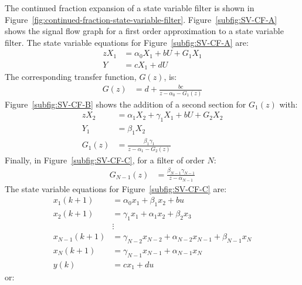 \documentclass[a4paper,twoside,10pt,english]{report}
\begin{document}
The continued fraction expansion of a state variable filter is shown in 
Figure~\ref{fig:continued-fraction-state-variable-filter}. 
Figure~\ref{subfig:SV-CF-A} shows the signal flow graph for a first order 
approximation to a state variable filter. The state variable equations for 
Figure~\ref{subfig:SV-CF-A} are:
\begin{align*}
zX_{1}&=\alpha_{0}X_{1}+bU + G_{1}X_{1}\\
Y&=cX_{1}+dU
\end{align*}
The corresponding transfer function, $G\left(z\right)$, is:
\begin{align*}
G\left(z\right)&=d + \frac{bc}{z-\alpha_{0}-G_{1}\left(z\right)}
\end{align*}
Figure~\ref{subfig:SV-CF-B} shows the addition of a second section for
$G_{1}\left(z\right)$ with:
\begin{align*}
zX_{2}&=\alpha_{1}X_{2}+\gamma_{1}X_{1}+bU + G_{2}X_{2}\\
Y_{1}&=\beta_{1}X_{2}\\
G_{1}\left(z\right)&=\frac{\beta_{1}\gamma_{1}}{z-\alpha_{1}-G_{2}\left(z\right)}
\end{align*}
Finally, in Figure~\ref{subfig:SV-CF-C}, for a filter of order $N$:
\begin{align*}
G_{N-1}\left(z\right)&=\frac{\beta_{N-1}\gamma_{N-1}}{z-\alpha_{N-1}}
\end{align*}
The state variable equations for Figure~\ref{subfig:SV-CF-C} are:
\begin{align*}
x_{1}\left(k+1\right)&=\alpha_{0}x_{1} + \beta_{1}x_{2} + bu\\
x_{2}\left(k+1\right)&=\gamma_{1}x_{1} + \alpha_{1}x_{2} + \beta_{2}x_{3}\\
&\vdots\\
x_{N-1}\left(k+1\right)&=\gamma_{N-2}x_{N-2}+\alpha_{N-2}x_{N-1} + \beta_{N-1}x_{N}\\
x_{N}\left(k+1\right)&=\gamma_{N-1}x_{N-1} + \alpha_{N-1}x_{N}\\
y\left(k\right)&=cx_{1} + du
\end{align*}
or:
\end{document}

